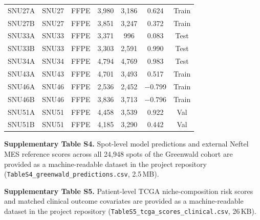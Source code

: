 \documentclass[11pt,letterpaper]{article}
\begin{document}
\begin{table}[H]
\begin{tabular}{llccccc}
SNU27A         & SNU27   & FFPE   & 3{,}980 & 3{,}186 & 0.624  & Train \\
SNU27B         & SNU27   & FFPE   & 3{,}851 & 3{,}247 & 0.372  & Train \\
SNU33A         & SNU33   & FFPE   & 3{,}371 & 996     & 0.083  & Test \\
SNU33B         & SNU33   & FFPE   & 3{,}303 & 2{,}591 & 0.990  & Test \\
SNU34A         & SNU34   & FFPE   & 4{,}794 & 4{,}769 & 0.983  & Test \\
SNU43A         & SNU43   & FFPE   & 4{,}701 & 3{,}493 & 0.517  & Train \\
SNU46A         & SNU46   & FFPE   & 2{,}536 & 2{,}452 & $-$0.799 & Train \\
SNU46B         & SNU46   & FFPE   & 3{,}836 & 3{,}713 & $-$0.796 & Train \\
SNU51A         & SNU51   & FFPE   & 4{,}458 & 3{,}539 & 0.922  & Val \\
SNU51B         & SNU51   & FFPE   & 4{,}185 & 3{,}290 & 0.442  & Val \\
\bottomrule
\end{tabular}
\end{table}

\vspace{1em}
\noindent\textbf{Supplementary Table S4.} Spot-level model predictions and external Neftel MES reference scores across all 24{,}948 spots of the Greenwald cohort are provided as a machine-readable dataset in the project repository (\texttt{TableS4\_}\allowbreak\texttt{greenwald\_}\allowbreak\texttt{predictions.csv}, 2.5\,MB).

\vspace{0.5em}
\noindent\textbf{Supplementary Table S5.} Patient-level TCGA niche-composition risk scores and matched clinical outcome covariates are provided as a machine-readable dataset in the project repository (\texttt{TableS5\_}\allowbreak\texttt{tcga\_}\allowbreak\texttt{scores\_}\allowbreak\texttt{clinical.csv}, 26\,KB).

\clearpage
\end{document}
